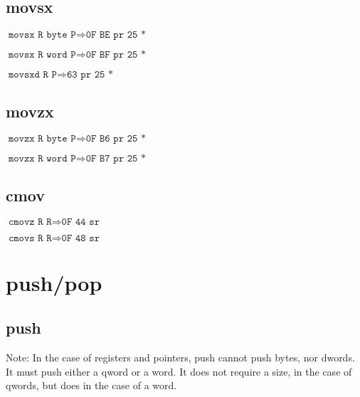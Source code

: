 \documentclass{article}
\begin{document}
\subsection{movsx}

\begin{minipage}{\textwidth}

$\texttt{movsx R byte P} \Rightarrow \texttt{0F BE pr 25 *}$

$\texttt{movsx R word P} \Rightarrow \texttt{0F BF pr 25 *}$

$\texttt{movsxd R P} \Rightarrow \texttt{63 pr 25 *}$

\end{minipage}


\subsection{movzx}

\begin{minipage}{\textwidth}

$\texttt{movzx R byte P} \Rightarrow \texttt{0F B6 pr 25 *}$

$\texttt{movzx R word P} \Rightarrow \texttt{0F B7 pr 25 *}$

\end{minipage}


\subsection{cmov}

\begin{minipage}{\textwidth}

$\texttt{cmovz R R} \Rightarrow \texttt{0F 44 sr}$

$\texttt{cmovs R R} \Rightarrow \texttt{0F 48 sr}$

\end{minipage}



\section{push/pop}

\subsection{push}

Note: In the case of registers and pointers, push cannot push bytes, nor dwords.
It must push either a qword or a word.
It does not require a size, in the case of qwords, but does in the case of a
word.
\end{document}
